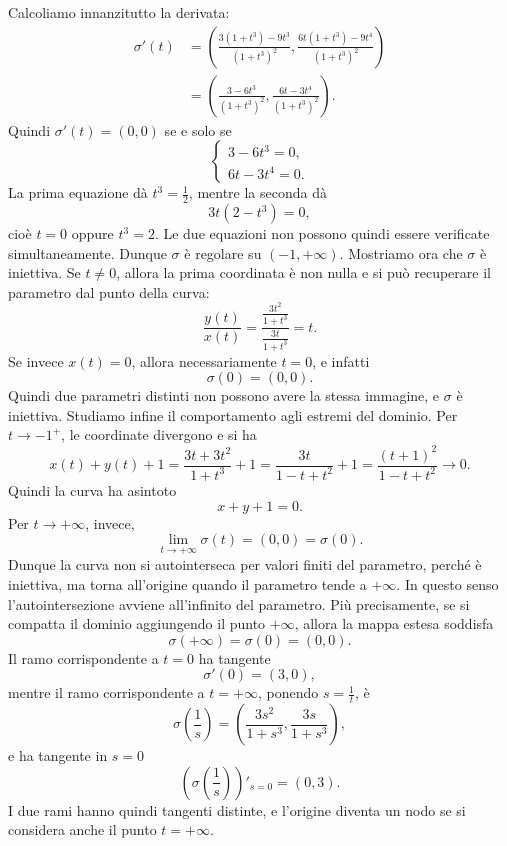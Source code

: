 \documentclass[a4paper]{article}
\begin{document}
\begin{snippetsolution}{}
    Calcoliamo innanzitutto la derivata:
    \begin{align*}
        \sigma'(t)
        &=
        \left(
            \frac{3(1+t^3)-9t^3}{(1+t^3)^2},
            \frac{6t(1+t^3)-9t^4}{(1+t^3)^2}
        \right)\\
        &=
        \left(
            \frac{3-6t^3}{(1+t^3)^2},
            \frac{6t-3t^4}{(1+t^3)^2}
        \right).
    \end{align*}
    Quindi \(\sigma'(t)=(0,0)\) se e solo se
    \[
        \begin{cases}
            3-6t^3=0,\\
            6t-3t^4=0.
        \end{cases}
    \]
    La prima equazione dà \(t^3=\frac12\), mentre la seconda dà
    \[
        3t(2-t^3)=0,
    \]
    cioè \(t=0\) oppure \(t^3=2\). Le due equazioni non possono quindi essere verificate simultaneamente. Dunque \(\sigma\) è regolare su \((-1,+\infty)\).
    Mostriamo ora che \(\sigma\) è iniettiva. Se \(t\neq 0\), allora la prima coordinata è non nulla e si può recuperare il parametro dal punto della curva:
    \[
        \frac{y(t)}{x(t)}
        =
        \frac{\frac{3t^2}{1+t^3}}{\frac{3t}{1+t^3}}
        =
        t.
    \]
    Se invece \(x(t)=0\), allora necessariamente \(t=0\), e infatti
    \[
        \sigma(0)=(0,0).
    \]
    Quindi due parametri distinti non possono avere la stessa immagine, e \(\sigma\) è iniettiva.
    Studiamo infine il comportamento agli estremi del dominio. Per \(t\to -1^+\), le coordinate divergono e si ha
    \[
        x(t)+y(t)+1
        =
        \frac{3t+3t^2}{1+t^3}+1
        =
        \frac{3t}{1-t+t^2}+1
        =
        \frac{(t+1)^2}{1-t+t^2}
        \longrightarrow 0.
    \]
    Quindi la curva ha asintoto
    \[
        x+y+1=0.
    \]
    Per \(t\to+\infty\), invece,
    \[
        \lim_{t\to+\infty}\sigma(t)=(0,0)=\sigma(0).
    \]
    Dunque la curva non si autointerseca per valori finiti del parametro, perché è iniettiva, ma torna all'origine quando il parametro tende a \(+\infty\). In questo senso l'autointersezione avviene all'infinito del parametro.
    Più precisamente, se si compatta il dominio aggiungendo il punto \(+\infty\), allora la mappa estesa soddisfa
    \[
        \sigma(+\infty)=\sigma(0)=(0,0).
    \]
    Il ramo corrispondente a \(t=0\) ha tangente
    \[
        \sigma'(0)=(3,0),
    \]
    mentre il ramo corrispondente a \(t=+\infty\), ponendo \(s=\frac1t\), è
    \[
        \sigma\left(\frac1s\right)
        =
        \left(
            \frac{3s^2}{1+s^3},
            \frac{3s}{1+s^3}
        \right),
    \]
    e ha tangente in \(s=0\)
    \[
        \left(\sigma\left(\frac1s\right)\right)'_{s=0}=(0,3).
    \]
    I due rami hanno quindi tangenti distinte, e l'origine diventa un nodo se si considera anche il punto \(t=+\infty\).
\end{snippetsolution}
\end{document}
